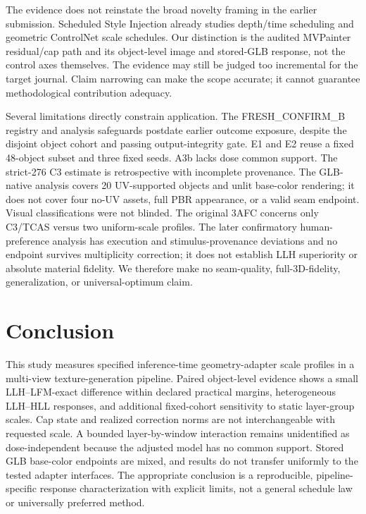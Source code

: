 \documentclass[times,twocolumn,final]{elsarticle}
\begin{document}
The evidence does not reinstate the broad novelty framing in the earlier submission. Scheduled Style Injection already studies depth/time scheduling and geometric ControlNet scale schedules. Our distinction is the audited MVPainter residual/cap path and its object-level image and stored-GLB response, not the control axes themselves. The evidence may still be judged too incremental for the target journal. Claim narrowing can make the scope accurate; it cannot guarantee methodological contribution adequacy.

Several limitations directly constrain application. The FRESH\_CONFIRM\_B registry and analysis safeguards postdate earlier outcome exposure, despite the disjoint object cohort and passing output-integrity gate. E1 and E2 reuse a fixed 48-object subset and three fixed seeds. A3b lacks dose common support. The strict-276 C3 estimate is retrospective with incomplete provenance. The GLB-native analysis covers 20 UV-supported objects and unlit base-color rendering; it does not cover four no-UV assets, full PBR appearance, or a valid seam endpoint. Visual classifications were not blinded. The original 3AFC concerns only C3/TCAS versus two uniform-scale profiles. The later confirmatory human-preference analysis has execution and stimulus-provenance deviations and no endpoint survives multiplicity correction; it does not establish LLH superiority or absolute material fidelity. We therefore make no seam-quality, full-3D-fidelity, generalization, or universal-optimum claim.

\section{Conclusion}

This study measures specified inference-time geometry-adapter scale profiles in a multi-view texture-generation pipeline. Paired object-level evidence shows a small LLH--LFM-exact difference within declared practical margins, heterogeneous LLH--HLL responses, and additional fixed-cohort sensitivity to static layer-group scales. Cap state and realized correction norms are not interchangeable with requested scale. A bounded layer-by-window interaction remains unidentified as dose-independent because the adjusted model has no common support. Stored GLB base-color endpoints are mixed, and results do not transfer uniformly to the tested adapter interfaces. The appropriate conclusion is a reproducible, pipeline-specific response characterization with explicit limits, not a general schedule law or universally preferred method.
\end{document}
